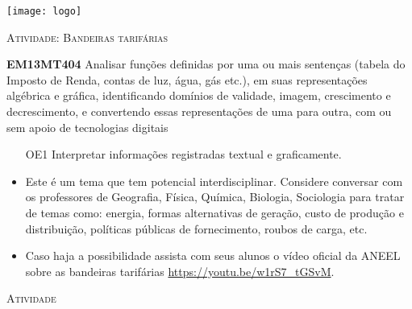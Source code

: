 \documentclass[10 pt,usenames,dvipsnames, oneside]{article}
\begin{document}
\begin{center}
  \begin{minipage}[l]{3cm}
\texttt{[image: logo]}    
\end{minipage}\hfill
\begin{minipage}[r]{.8\textwidth}
 {\Large \scshape Atividade: Bandeiras tarifárias}  
\end{minipage}
\end{center}
\vspace{.2cm}

\ifdefined\prof
\begin{objetivos}
\item \textbf{EM13MT404} Analisar funções definidas por uma ou mais sentenças (tabela do Imposto de Renda, contas de luz, água, gás etc.), em suas representações algébrica e gráfica, identificando domínios de validade, imagem, crescimento e decrescimento, e convertendo essas representações de uma para outra, com ou sem apoio de tecnologias digitais
\end{objetivos}

\begin{goals}

\begin{enumerate}

\item[OE1] Interpretar informações registradas textual e graficamente.

\end{enumerate}

\tcblower

\begin{itemize}
\item Este é um tema que tem potencial interdisciplinar. Considere conversar com os professores de Geografia, Física, Química, Biologia, Sociologia para tratar de temas como: energia, formas alternativas de geração, custo de produção e distribuição, políticas públicas de fornecimento, roubos de carga, etc.

\item Caso haja a possibilidade assista com seus alunos o vídeo oficial da ANEEL sobre as bandeiras tarifárias \url{https://youtu.be/w1rS7_tGSvM}.
\end{itemize}

\end{goals}

\bigskip
\begin{center}
{\large \scshape Atividade}
\end{center}
\fi
\end{document}
